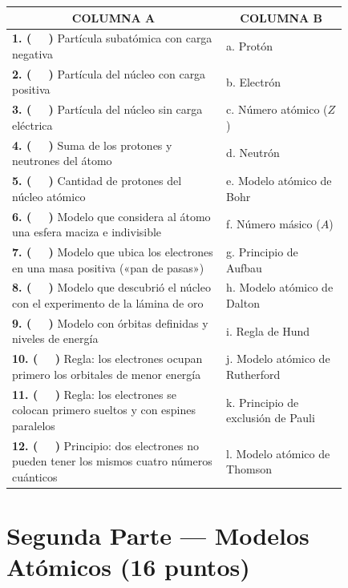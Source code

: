 \documentclass[12pt, letterpaper]{article}
\begin{document}
\vspace{6pt}
\begin{center}
\renewcommand{\arraystretch}{1.28}
\small
\begin{tabular}{|p{0.53\linewidth}|p{0.30\linewidth}|}
\hline
\multicolumn{1}{|c|}{\textbf{COLUMNA A}} & \multicolumn{1}{c|}{\textbf{COLUMNA B}} \\
\hline
\textbf{1. ( \ \ )} Partícula subatómica con carga negativa & a. Protón \\
\hline
\textbf{2. ( \ \ )} Partícula del núcleo con carga positiva & b. Electrón \\
\hline
\textbf{3. ( \ \ )} Partícula del núcleo sin carga eléctrica & c. Número atómico ($Z$) \\
\hline
\textbf{4. ( \ \ )} Suma de los protones y neutrones del átomo & d. Neutrón \\
\hline
\textbf{5. ( \ \ )} Cantidad de protones del núcleo atómico & e. Modelo atómico de Bohr \\
\hline
\textbf{6. ( \ \ )} Modelo que considera al átomo una esfera maciza e indivisible & f. Número másico ($A$) \\
\hline
\textbf{7. ( \ \ )} Modelo que ubica los electrones en una masa positiva («pan de pasas») & g. Principio de Aufbau \\
\hline
\textbf{8. ( \ \ )} Modelo que descubrió el núcleo con el experimento de la lámina de oro & h. Modelo atómico de Dalton \\
\hline
\textbf{9. ( \ \ )} Modelo con órbitas definidas y niveles de energía & i. Regla de Hund \\
\hline
\textbf{10. ( \ \ )} Regla: los electrones ocupan primero los orbitales de menor energía & j. Modelo atómico de Rutherford \\
\hline
\textbf{11. ( \ \ )} Regla: los electrones se colocan primero sueltos y con espines paralelos & k. Principio de exclusión de Pauli \\
\hline
\textbf{12. ( \ \ )} Principio: dos electrones no pueden tener los mismos cuatro números cuánticos & l. Modelo atómico de Thomson \\
\hline
\end{tabular}
\end{center}

\newpage

\section*{Segunda Parte — Modelos Atómicos (16 puntos)}
\end{document}

